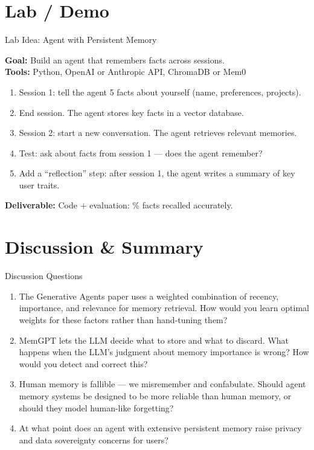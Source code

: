 \documentclass[aspectratio=169,10pt]{beamer}
\begin{document}
\section{Lab / Demo}
\begin{frame}{Lab Idea: Agent with Persistent Memory}
  \begin{tcolorbox}[hitbox, title=Lab 9 — Memory-Enabled Conversational Agent]
    \textbf{Goal:} Build an agent that remembers facts across sessions.\\[4pt]
    \textbf{Tools:} Python, OpenAI or Anthropic API, ChromaDB or Mem0
    \begin{enumerate}
      \item Session 1: tell the agent 5 facts about yourself (name, preferences, projects).
      \item End session. The agent stores key facts in a vector database.
      \item Session 2: start a new conversation. The agent retrieves relevant memories.
      \item Test: ask about facts from session 1 — does the agent remember?
      \item Add a ``reflection'' step: after session 1, the agent writes a summary of key user traits.
    \end{enumerate}
    \textbf{Deliverable:} Code + evaluation: \% facts recalled accurately.
  \end{tcolorbox}
\end{frame}

\section{Discussion \& Summary}
\begin{frame}{Discussion Questions}
  \begin{enumerate}
    \item The Generative Agents paper uses a weighted combination of recency, importance, and relevance for memory retrieval. How would you learn optimal weights for these factors rather than hand-tuning them?
    \item MemGPT lets the LLM decide what to store and what to discard. What happens when the LLM's judgment about memory importance is wrong? How would you detect and correct this?
    \item Human memory is fallible — we misremember and confabulate. Should agent memory systems be designed to be more reliable than human memory, or should they model human-like forgetting?
    \item At what point does an agent with extensive persistent memory raise privacy and data sovereignty concerns for users?
  \end{enumerate}
\end{frame}
\end{document}
